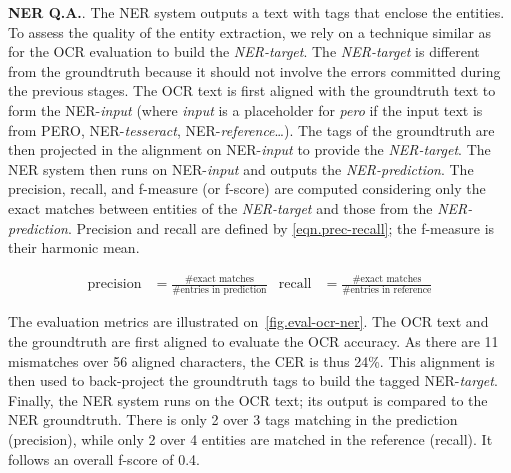 

\textbf{NER Q.A.}. The NER system outputs a text with tags that enclose the entities. To assess the quality of the
entity extraction, we rely on a technique similar as for the OCR evaluation to build the \emph{NER-target}. The
\emph{NER-target} is different from the groundtruth because it should not involve the errors committed during the
previous stages. The OCR text is first aligned with the groundtruth text to form the NER-\emph{input} (where
\emph{input} is a placeholder for \emph{pero} if the input text is from PERO, NER-\emph{tesseract},
NER-\emph{reference}\ldots). The tags of the groundtruth are then projected in the alignment on NER-\emph{input} to
provide the \emph{NER-target}. The NER system then runs on NER-\emph{input} and outputs the \emph{NER-prediction}. The
precision, recall, and f-measure (or f-score) are computed considering only the exact matches between entities of the
\emph{NER-target} and those from the \emph{NER-prediction}. Precision and recall are defined by \cref{eqn.prec-recall};
the f-measure is their harmonic mean.

\begin{align}
    \mathrm{precision} &= \frac{\text{\#exact matches}}{\text{\#entries in prediction}} & \mathrm{recall} &= \frac{\text{\#exact matches}}{\text{\#entries in reference}}
    \label{eqn.prec-recall}
\end{align}


The evaluation metrics are illustrated on~\cref{fig.eval-ocr-ner}. The OCR text and the groundtruth are first aligned to
evaluate the OCR accuracy. As there are 11 mismatches over 56 aligned characters, the CER is thus 24\%. This alignment
is then used to back-project the groundtruth tags to build the tagged NER-\emph{target}. Finally, the NER system runs on the
OCR text; its output is compared to the NER groundtruth. There is only 2 over 3 tags matching in the prediction (precision),
while only 2 over 4 entities are matched in the reference (recall). It follows an overall f-score of 0.4.






